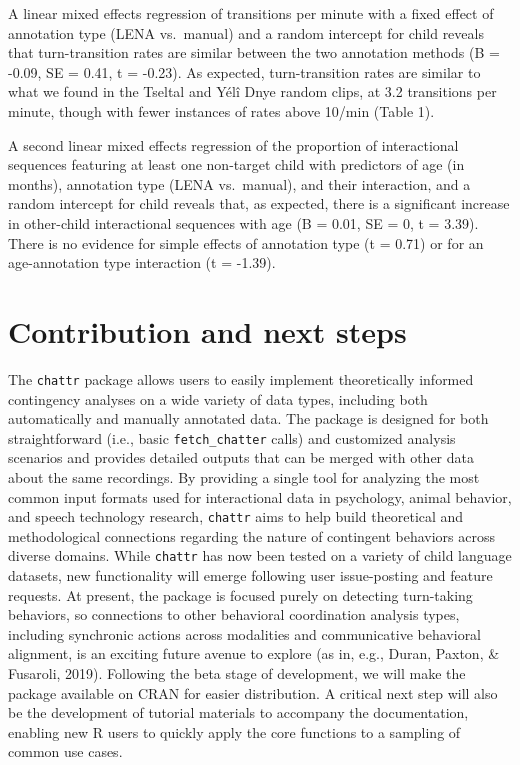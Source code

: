 \documentclass[10pt, letterpaper]{article}
\begin{document}
A linear mixed effects regression of transitions per minute with a fixed
effect of annotation type (LENA vs.~manual) and a random intercept for
child reveals that turn-transition rates are similar between the two
annotation methods (B = -0.09, SE = 0.41, t = -0.23). As expected,
turn-transition rates are similar to what we found in the Tseltal and
Yélî Dnye random clips, at 3.2 transitions per minute, though with fewer
instances of rates above 10/min (Table 1).

A second linear mixed effects regression of the proportion of
interactional sequences featuring at least one non-target child with
predictors of age (in months), annotation type (LENA vs.~manual), and
their interaction, and a random intercept for child reveals that, as
expected, there is a significant increase in other-child interactional
sequences with age (B = 0.01, SE = 0, t = 3.39). There is no evidence
for simple effects of annotation type (t = 0.71) or for an
age-annotation type interaction (t = -1.39).

\hypertarget{contribution-and-next-steps}{%
\section{Contribution and next
steps}\label{contribution-and-next-steps}}

The \texttt{chattr} package allows users to easily implement
theoretically informed contingency analyses on a wide variety of data
types, including both automatically and manually annotated data. The
package is designed for both straightforward (i.e., basic
\texttt{fetch\_chatter} calls) and customized analysis scenarios and
provides detailed outputs that can be merged with other data about the
same recordings. By providing a single tool for analyzing the most
common input formats used for interactional data in psychology, animal
behavior, and speech technology research, \texttt{chattr} aims to help
build theoretical and methodological connections regarding the nature of
contingent behaviors across diverse domains. While \texttt{chattr} has
now been tested on a variety of child language datasets, new
functionality will emerge following user issue-posting and feature
requests. At present, the package is focused purely on detecting
turn-taking behaviors, so connections to other behavioral coordination
analysis types, including synchronic actions across modalities and
communicative behavioral alignment, is an exciting future avenue to
explore (as in, e.g., Duran, Paxton, \& Fusaroli, 2019). Following the
beta stage of development, we will make the package available on CRAN
for easier distribution. A critical next step will also be the
development of tutorial materials to accompany the documentation,
enabling new R users to quickly apply the core functions to a sampling
of common use cases.
\end{document}

